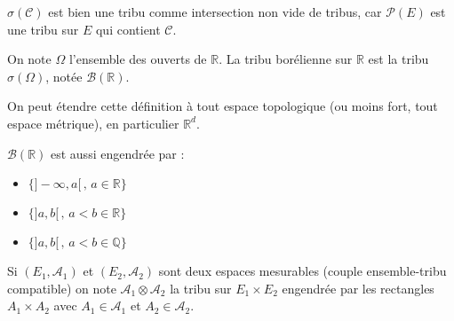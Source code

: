 \begin{remarque}
	$\sigma(\mathscr{C})$ est bien une tribu comme intersection non vide de tribus,
	car $\mathscr{P}(E)$ est une tribu sur $E$ qui contient $\mathscr{C}$.
\end{remarque}

\begin{definition}
	On note $\Omega$ l'ensemble des ouverts de $\mathbb{R}$. La tribu borélienne sur
	$\mathbb{R}$ est la tribu $\sigma(\Omega)$, notée $\mathscr{B}(\mathbb{R})$.
\end{definition}


\begin{remarque}
	On peut étendre cette définition à tout espace topologique (ou moins fort, tout espace métrique), en particulier
	$\mathbb{R}^d$.
\end{remarque}

\begin{remarque}
	$\mathscr{B}(\mathbb{R})$ est aussi engendrée par :
	\begin{itemize}
		\item $\{ ]-\infty, a[\,,\, a \in \mathbb{R} \}$
		\item $\{ ]a, b[\,,\, a < b \in \mathbb{R} \}$
		\item $\{ ]a, b[\,,\, a < b \in \mathbb{Q} \}$
	\end{itemize}
\end{remarque}


\begin{definition}
	Si $(E_1, \mathscr{A}_1)$ et $(E_2, \mathscr{A}_2)$ sont deux espaces mesurables (couple ensemble-tribu compatible)
	on note $\mathscr{A}_1 \otimes \mathscr{A}_2$ la tribu sur $E_1 \times E_2$ engendrée
	par les rectangles $A_1 \times A_2$ avec $A_1 \in \mathscr{A}_1$ et $A_2 \in \mathscr{A}_2$.

\end{definition}


